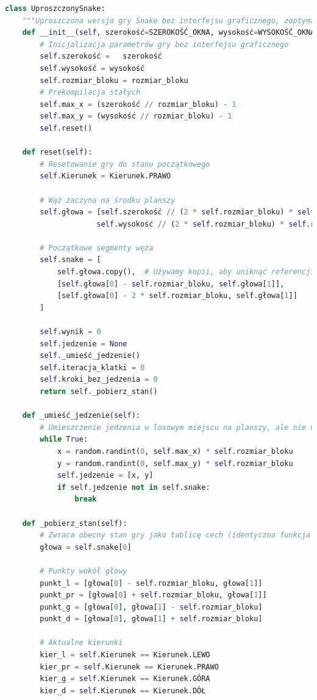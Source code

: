 \documentclass[a4paper,12pt]{article}
\begin{document}
\begin{lstlisting}[language=Python]
class UproszczonySnake:
    """Uproszczona wersja gry Snake bez interfejsu graficznego, zoptymalizowana pod kątem szybkości."""
    def __init__(self, szerokość=SZEROKOŚĆ_OKNA, wysokość=WYSOKOŚĆ_OKNA, rozmiar_bloku=ROZMIAR_BLOKU):
        # Inicjalizacja parametrów gry bez interfejsu graficznego
        self.szerokość =   szerokość
        self.wysokość = wysokość
        self.rozmiar_bloku = rozmiar_bloku
        # Prekompilacja stałych
        self.max_x = (szerokość // rozmiar_bloku) - 1
        self.max_y = (wysokość // rozmiar_bloku) - 1
        self.reset()
    
    def reset(self):
        # Resetowanie gry do stanu początkowego
        self.Kierunek = Kierunek.PRAWO
        
        # Wąż zaczyna na środku planszy
        self.głowa = [self.szerokość // (2 * self.rozmiar_bloku) * self.rozmiar_bloku, 
                     self.wysokość // (2 * self.rozmiar_bloku) * self.rozmiar_bloku]
        
        # Początkowe segmenty węża
        self.snake = [
            self.głowa.copy(),  # Używamy kopii, aby uniknąć referencji
            [self.głowa[0] - self.rozmiar_bloku, self.głowa[1]],
            [self.głowa[0] - 2 * self.rozmiar_bloku, self.głowa[1]]
        ]
        
        self.wynik = 0
        self.jedzenie = None
        self._umieść_jedzenie()
        self.iteracja_klatki = 0
        self.kroki_bez_jedzenia = 0
        return self._pobierz_stan()
    
    def _umieść_jedzenie(self):
        # Umieszczenie jedzenia w losowym miejscu na planszy, ale nie na wężu
        while True:
            x = random.randint(0, self.max_x) * self.rozmiar_bloku
            y = random.randint(0, self.max_y) * self.rozmiar_bloku
            self.jedzenie = [x, y]
            if self.jedzenie not in self.snake:
                break
    
    def _pobierz_stan(self):
        # Zwraca obecny stan gry jako tablicę cech (identyczna funkcja jak w SnakeGame)
        głowa = self.snake[0]
        
        # Punkty wokół głowy
        punkt_l = [głowa[0] - self.rozmiar_bloku, głowa[1]]
        punkt_pr = [głowa[0] + self.rozmiar_bloku, głowa[1]]
        punkt_g = [głowa[0], głowa[1] - self.rozmiar_bloku]
        punkt_d = [głowa[0], głowa[1] + self.rozmiar_bloku]
        
        # Aktualne kierunki
        kier_l = self.Kierunek == Kierunek.LEWO
        kier_pr = self.Kierunek == Kierunek.PRAWO
        kier_g = self.Kierunek == Kierunek.GÓRA
        kier_d = self.Kierunek == Kierunek.DÓŁ
        

\end{lstlisting}
\end{document}
